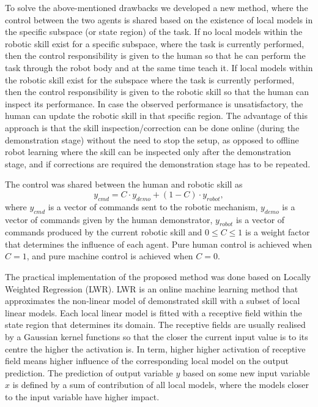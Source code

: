 To solve the above-mentioned drawbacks we developed a new method, where the control between the two agents is shared based on the existence of local models in the specific subspace (or state region) of the task. If no local models within the robotic skill exist for a specific subspace, where the task is currently performed, then the control responsibility is given to the human so that he can perform the task through the robot body and at the same time teach it. If local models within the robotic skill exist for the subspace where the task is currently performed, then the control responsibility is given to the robotic skill so that the human can inspect its performance. In case the observed performance is unsatisfactory, the human can update the robotic skill in that specific region. The advantage of this approach is that the skill inspection/correction can be done online (during the demonstration stage) without the need to stop the setup, as opposed to offline robot learning where the skill can be inspected only after the demonstration stage, and if corrections are required the demonstration stage has to be repeated.

The control was shared between the human and robotic skill as \cite{Peternel2013}
\begin{equation}
y_{cmd} = C \cdot y_{demo} + (1-C) \cdot y_{robot} ,
\label{eq:delegation}
\end{equation}
where $y_{cmd}$ is a vector of commands sent to the robotic mechanism, $y_{demo}$ is a vector of commands given by the human demonstrator, $y_{robot}$ is a vector of commands produced by the current robotic skill and $0 \leq C \leq 1$ is a weight factor that determines the influence of each agent. Pure human control is achieved when $C = 1$, and pure machine control is achieved when $C = 0$.

The practical implementation of the proposed method was done based on Locally Weighted Regression (LWR)\cite{Schaal1998}. LWR is an online machine learning method that approximates the non-linear model of demonstrated skill with a subset of local linear models. Each local linear model is fitted with a receptive field within the state region that determines its domain. The receptive fields are usually realised by a Gaussian kernel functions so that the closer the current input value is to its centre the higher the activation is. In term, higher higher activation of receptive field means higher influence of the corresponding local model on the output prediction. The prediction of output variable $y$ based on some new input variable $x$ is defined by a sum of contribution of all local models, where the models closer to the input variable have higher impact.

